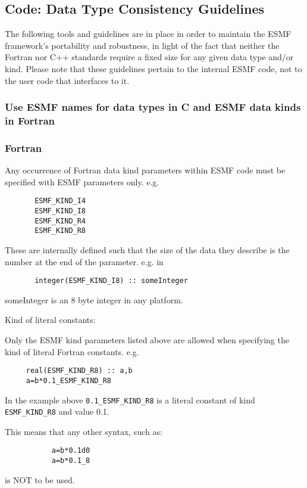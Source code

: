 
\subsection{Code: Data Type Consistency Guidelines}

The following tools and guidelines are in place in order to maintain the ESMF framework's portability and robustness, in light of the fact that neither the Fortran nor C++ standards require a fixed size for any given data type and/or kind. Please note that these guidelines pertain to the internal ESMF code, not to the user code that interfaces to it.

\subsubsection{Use ESMF names for data types in C and ESMF data kinds in Fortran}

\subsubsection{Fortran}

Any occurrence of Fortran data kind parameters within ESMF code must be specified with ESMF parameters only. e.g.
\begin{verbatim}
       ESMF_KIND_I4
       ESMF_KIND_I8
       ESMF_KIND_R4
       ESMF_KIND_R8
\end{verbatim}
These are internally defined such that the size of the data they describe is the number at the end of the parameter. e.g. in

\begin{verbatim}
       integer(ESMF_KIND_I8) :: someInteger
\end{verbatim}
someInteger is an 8 byte integer in any platform.

Kind of literal constants:

Only the ESMF kind parameters listed above are allowed when specifying the kind of literal Fortran constants. e.g.

\begin{verbatim}
     real(ESMF_KIND_R8) :: a,b
     a=b*0.1_ESMF_KIND_R8
\end{verbatim}

In the example above {\tt 0.1\_ESMF\_KIND\_R8} is a literal constant of kind {\tt ESMF\_KIND\_R8} and value 0.1.

This means that any other syntax, such as:
\begin{verbatim}
           a=b*0.1d0
           a=b*0.1_8
\end{verbatim}
is NOT to be used.

